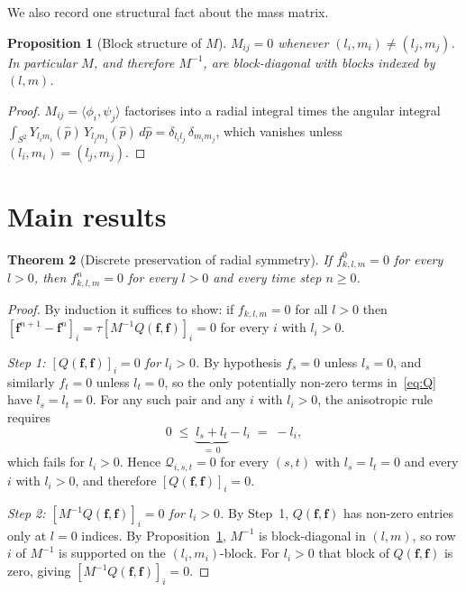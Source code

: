 \documentclass[11pt, a4paper]{article}
\newtheorem{theorem}{Theorem}
\newtheorem{proposition}[theorem]{Proposition}
\begin{document}
\noindent We also record one structural fact about the mass matrix.

\begin{proposition}[Block structure of $M$]\label{prop:block}
$M_{ij} = 0$ whenever $(l_i, m_i) \neq (l_j, m_j)$.  In particular $M$,
and therefore $M^{-1}$, are block-diagonal with blocks indexed by $(l, m)$.
\end{proposition}

\begin{proof}
$M_{ij} = \langle \phi_i, \psi_j \rangle$ factorises into a radial integral
times the angular integral $\int_{S^2} Y_{l_i m_i}(\hat p)\, Y_{l_j m_j}(\hat p)
\,d\hat p = \delta_{l_i l_j}\,\delta_{m_i m_j}$, which vanishes unless
$(l_i, m_i) = (l_j, m_j)$.
\end{proof}

\section*{Main results}

\begin{theorem}[Discrete preservation of radial symmetry]\label{thm:radial}
If $f^0_{k,l,m} = 0$ for every $l > 0$, then $f^n_{k,l,m} = 0$ for every
$l > 0$ and every time step $n \geq 0$.
\end{theorem}

\begin{proof}
By induction it suffices to show: if $f_{k,l,m} = 0$ for all $l > 0$ then
$[\mathbf{f}^{n+1} - \mathbf{f}^n]_i = \tau[M^{-1} Q(\mathbf{f},\mathbf{f})]_i
= 0$ for every $i$ with $l_i > 0$.

\textit{Step 1: $[Q(\mathbf{f},\mathbf{f})]_i = 0$ for $l_i > 0$.}
By hypothesis $f_s = 0$ unless $l_s = 0$, and similarly $f_t = 0$ unless
$l_t = 0$, so the only potentially non-zero terms in~\eqref{eq:Q} have
$l_s = l_t = 0$.  For any such pair and any $i$ with $l_i > 0$, the
anisotropic rule requires
\[
  0 \;\leq\; \underbrace{l_s + l_t}_{=\,0} - l_i \;=\; -l_i,
\]
which fails for $l_i > 0$.  Hence $\mathcal{Q}_{i,s,t} = 0$ for every
$(s,t)$ with $l_s = l_t = 0$ and every $i$ with $l_i > 0$, and therefore
$[Q(\mathbf{f},\mathbf{f})]_i = 0$.

\textit{Step 2: $[M^{-1} Q(\mathbf{f},\mathbf{f})]_i = 0$ for $l_i > 0$.}
By Step~1, $Q(\mathbf{f},\mathbf{f})$ has non-zero entries only at $l = 0$
indices.  By Proposition~\ref{prop:block}, $M^{-1}$ is block-diagonal in
$(l,m)$, so row $i$ of $M^{-1}$ is supported on the $(l_i, m_i)$-block.
For $l_i > 0$ that block of $Q(\mathbf{f},\mathbf{f})$ is zero, giving
$[M^{-1} Q(\mathbf{f},\mathbf{f})]_i = 0$.
\end{proof}
\end{document}
